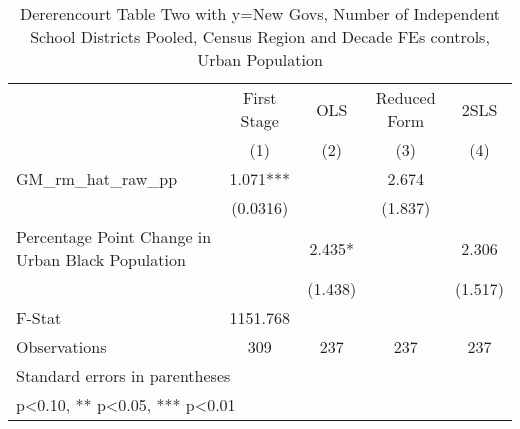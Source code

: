 \begin{table}[htbp]\centering
\def\sym#1{\ifmmode^{#1}\else\(^{#1}\)\fi}
\caption{Dererencourt Table Two with y=New Govs, Number of Independent School Districts  Pooled, Census Region and Decade FEs controls, Urban Population}
\begin{tabular}{l*{4}{c}}
\toprule
                    & First Stage   &         OLS   &Reduced Form   &        2SLS   \\
                    &\multicolumn{1}{c}{(1)}   &\multicolumn{1}{c}{(2)}   &\multicolumn{1}{c}{(3)}   &\multicolumn{1}{c}{(4)}   \\
\midrule
GM\_rm\_hat\_raw\_pp    &       1.071***&               &       2.674   &               \\
                    &    (0.0316)   &               &     (1.837)   &               \\
\addlinespace
Percentage Point Change in Urban Black Population&               &       2.435*  &               &       2.306   \\
                    &               &     (1.438)   &               &     (1.517)   \\
\midrule
F-Stat              &    1151.768   &               &               &               \\
Observations        &         309   &         237   &         237   &         237   \\
\bottomrule
\multicolumn{5}{l}{\footnotesize Standard errors in parentheses}\\
\multicolumn{5}{l}{\footnotesize * p<0.10, ** p<0.05, *** p<0.01}\\
\end{tabular}
\end{table}
